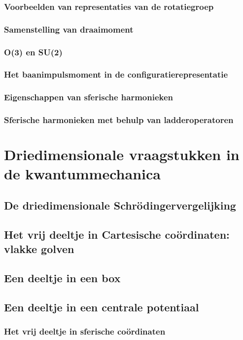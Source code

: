 \documentclass[a4paper,twoside]{article}
\theoremstyle{definition}
\theoremstyle{plain}
\begin{document}
\subsubsection{Voorbeelden van representaties van de rotatiegroep}
\subsubsection{Samenstelling van draaimoment}
\subsubsection{O(3) en SU(2)}
\subsubsection{Het baanimpulsmoment in de configuratierepresentatie}
\subsubsection{Eigenschappen van sferische harmonieken}
\subsubsection{Sferische harmonieken met behulp van ladderoperatoren}

\section{Driedimensionale vraagstukken in de kwantummechanica}
\subsection{De driedimensionale Schrödingervergelijking}
\subsection{Het vrij deeltje in Cartesische coördinaten: vlakke golven}
\subsection{Een deeltje in een box}
\subsection{Een deeltje in een centrale potentiaal}
\subsubsection{Het vrij deeltje in sferische coördinaten}
\end{document}
